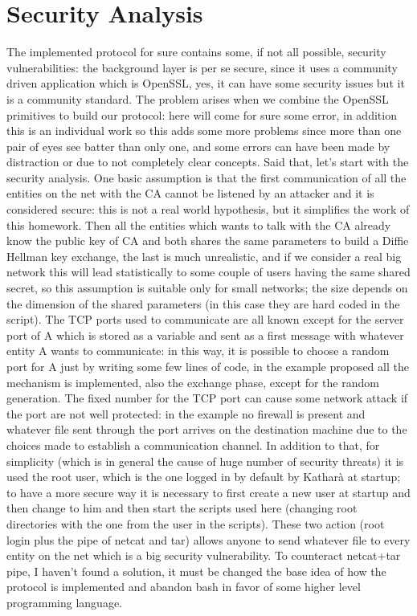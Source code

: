 \documentclass{article}
\begin{document}
\section{Security Analysis}
\label{sec:secAn}

The implemented protocol for sure contains some, if not all possible, security vulnerabilities: the background layer is per se secure, since it uses a community driven application which is OpenSSL, yes, it can have some security issues but it is a community standard. The problem arises when we combine the OpenSSL primitives to build our protocol: here will come for sure some error, in addition this is an individual work so this adds some more problems since more than one pair of eyes see batter than only one, and some errors can have been made by distraction or due to not completely clear concepts. Said that, let's start with the security analysis. \newline
One basic assumption is that the first communication of all the entities on the net with the CA cannot be listened by an attacker and it is considered secure: this is not a real world hypothesis, but it simplifies the work of this homework. Then all the entities which wants to talk with the CA already know the public key of CA and both shares the same parameters to build a Diffie Hellman key exchange, the last is much unrealistic, and if we consider a real big network this will lead statistically to some couple of users having the same shared secret, so this assumption is suitable only for small networks; the size depends on the dimension of the shared parameters (in this case they are hard coded in the script).\newline
The TCP ports used to communicate are all known except for the server port of A which is stored as a variable and sent as a first message with whatever entity A wants to communicate: in this way, it is possible to choose a random port for A just by writing some few lines of code, in the example proposed all the mechanism is implemented, also the exchange phase, except for the random generation. The fixed number for the TCP port can cause some network attack if the port are not well protected: in the example no firewall is present and whatever file sent through the port arrives on the destination machine due to the choices made to establish a communication channel. In addition to that, for simplicity (which is in general the cause of huge number of security threats) it is used the root user, which is the one logged in by default by Katharà at startup; to have a more secure way it is necessary to first create a new user at startup and then change to him and then start the scripts used here (changing root directories with the one from the user in the scripts). These two action (root login plus the pipe of netcat and tar) allows anyone to send whatever file to every entity on the net which is a big security vulnerability. To counteract netcat+tar pipe, I haven't found a solution, it must be changed the base idea of how the protocol is implemented and abandon bash in favor of some higher level programming language.\newline
\end{document}
